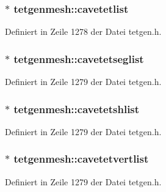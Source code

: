 \hypertarget{classtetgenmesh_afe7e3666b7e2bebcf534b48d5ce027f1}{
\subsubsection[{cavetetlist}]{$\ast$ tetgenmesh\-::cavetetlist}}\label{classtetgenmesh_afe7e3666b7e2bebcf534b48d5ce027f1}


Definiert in Zeile 1278 der Datei tetgen.\-h.

\hypertarget{classtetgenmesh_a278c321d14ab76b15cd6865af5d5cce0}{
\subsubsection[{cavetetseglist}]{ $\ast$ tetgenmesh\-::cavetetseglist}}\label{classtetgenmesh_a278c321d14ab76b15cd6865af5d5cce0}


Definiert in Zeile 1279 der Datei tetgen.\-h.

\hypertarget{classtetgenmesh_a54b80635914f6a66ff7a9f403bfd994c}{
\subsubsection[{cavetetshlist}]{$\ast$ tetgenmesh\-::cavetetshlist}}\label{classtetgenmesh_a54b80635914f6a66ff7a9f403bfd994c}


Definiert in Zeile 1279 der Datei tetgen.\-h.

\hypertarget{classtetgenmesh_a49554466794bb8f1b97d48d2061be4ca}{
\subsubsection[{cavetetvertlist}]{ $\ast$ tetgenmesh\-::cavetetvertlist}}\label{classtetgenmesh_a49554466794bb8f1b97d48d2061be4ca}


Definiert in Zeile 1279 der Datei tetgen.\-h.

